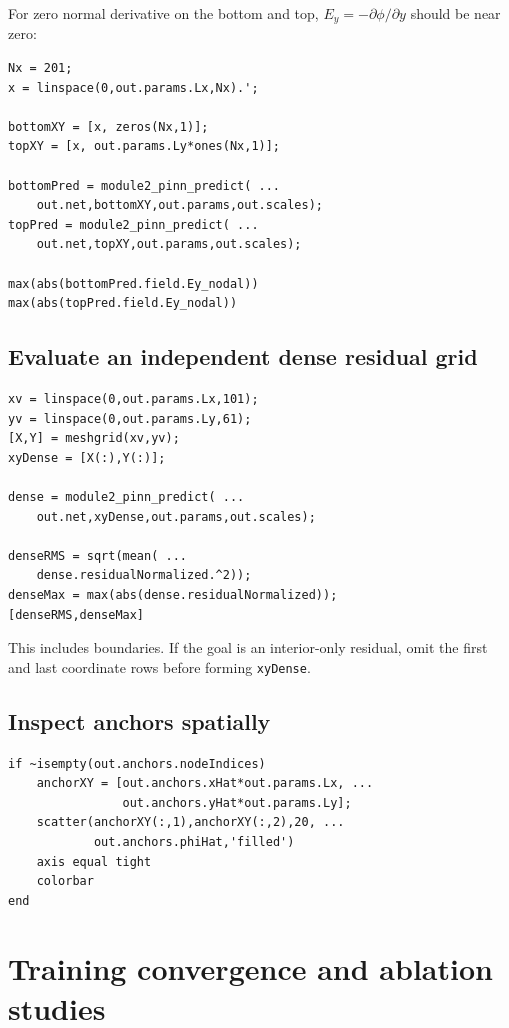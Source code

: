 \documentclass[11pt]{article}
\begin{document}
For zero normal derivative on the bottom and top, $E_y=-\partial\phi/\partial y$ should be near zero:
\begin{lstlisting}[style=projectmatlab]
Nx = 201;
x = linspace(0,out.params.Lx,Nx).';

bottomXY = [x, zeros(Nx,1)];
topXY = [x, out.params.Ly*ones(Nx,1)];

bottomPred = module2_pinn_predict( ...
    out.net,bottomXY,out.params,out.scales);
topPred = module2_pinn_predict( ...
    out.net,topXY,out.params,out.scales);

max(abs(bottomPred.field.Ey_nodal))
max(abs(topPred.field.Ey_nodal))
\end{lstlisting}

\subsection{Evaluate an independent dense residual grid}

\begin{lstlisting}[style=projectmatlab]
xv = linspace(0,out.params.Lx,101);
yv = linspace(0,out.params.Ly,61);
[X,Y] = meshgrid(xv,yv);
xyDense = [X(:),Y(:)];

dense = module2_pinn_predict( ...
    out.net,xyDense,out.params,out.scales);

denseRMS = sqrt(mean( ...
    dense.residualNormalized.^2));
denseMax = max(abs(dense.residualNormalized));
[denseRMS,denseMax]
\end{lstlisting}
This includes boundaries. If the goal is an interior-only residual, omit the first and last coordinate rows before forming \texttt{xyDense}.

\subsection{Inspect anchors spatially}

\begin{lstlisting}[style=projectmatlab]
if ~isempty(out.anchors.nodeIndices)
    anchorXY = [out.anchors.xHat*out.params.Lx, ...
                out.anchors.yHat*out.params.Ly];
    scatter(anchorXY(:,1),anchorXY(:,2),20, ...
            out.anchors.phiHat,'filled')
    axis equal tight
    colorbar
end
\end{lstlisting}

\section{Training convergence and ablation studies}
\end{document}
